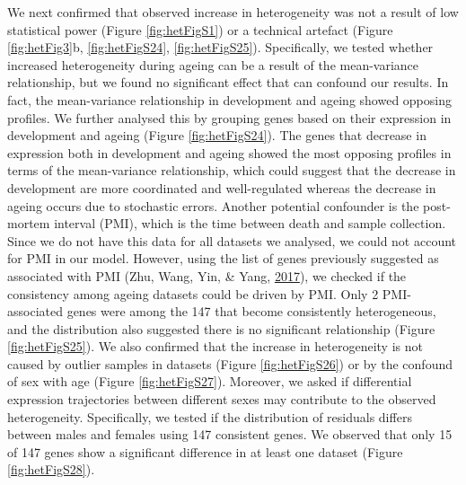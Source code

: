 \documentclass[12pt,twoside]{unicam}
\begin{document}
We next confirmed that observed increase in heterogeneity was not a result of low statistical power (Figure \ref{fig:hetFigS1}) or a technical artefact (Figure \ref{fig:hetFig3}b, \ref{fig:hetFigS24}, \ref{fig:hetFigS25}). Specifically, we tested whether increased heterogeneity during ageing can be a result of the mean-variance relationship, but we found no significant effect that can confound our results. In fact, the mean-variance relationship in development and ageing showed opposing profiles. We further analysed this by grouping genes based on their expression in development and ageing (Figure \ref{fig:hetFigS24}). The genes that decrease in expression both in development and ageing showed the most opposing profiles in terms of the mean-variance relationship, which could suggest that the decrease in development are more coordinated and well-regulated whereas the decrease in ageing occurs due to stochastic errors. Another potential confounder is the post-mortem interval (PMI), which is the time between death and sample collection. Since we do not have this data for all datasets we analysed, we could not account for PMI in our model. However, using the list of genes previously suggested as associated with PMI (Zhu, Wang, Yin, \& Yang, \protect\hyperlink{ref-Zhu2017}{2017}), we checked if the consistency among ageing datasets could be driven by PMI. Only 2 PMI-associated genes were among the 147 that become consistently heterogeneous, and the distribution also suggested there is no significant relationship (Figure \ref{fig:hetFigS25}). We also confirmed that the increase in heterogeneity is not caused by outlier samples in datasets (Figure \ref{fig:hetFigS26}) or by the confound of sex with age (Figure \ref{fig:hetFigS27}). Moreover, we asked if differential expression trajectories between different sexes may contribute to the observed heterogeneity. Specifically, we tested if the distribution of residuals differs between males and females using 147 consistent genes. We observed that only 15 of 147 genes show a significant difference in at least one dataset (Figure \ref{fig:hetFigS28}).
\end{document}
